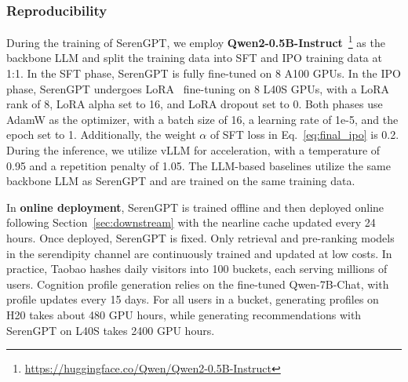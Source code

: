 \subsubsection{Reproducibility} During the training of SerenGPT, we employ \textbf{Qwen2-0.5B-Instruct}~\footnote{\url{https://huggingface.co/Qwen/Qwen2-0.5B-Instruct}} as the backbone LLM and split the training data into SFT and IPO training data at 1:1. In the SFT phase, SerenGPT is fully fine-tuned on 8 A100 GPUs. In the IPO phase, SerenGPT undergoes LoRA~\cite{hu2021lora} fine-tuning on 8 L40S GPUs, with a LoRA rank of 8, LoRA alpha set to 16, and LoRA dropout set to 0. Both phases use AdamW as the optimizer, with a batch size of 16, a learning rate of 1e-5, and the epoch set to 1. Additionally, the weight $\alpha$ of SFT loss in Eq.~\eqref{eq:final_ipo} is 0.2. During the inference, we utilize vLLM for acceleration, with a temperature of 0.95 and a repetition penalty of 1.05. The LLM-based baselines utilize the same backbone LLM as SerenGPT and are trained on the same training data.

In \textbf{online deployment}, SerenGPT is trained offline and then deployed online following Section~\ref{sec:downstream} with the nearline cache updated every 24 hours. Once deployed, SerenGPT is fixed. Only retrieval and pre-ranking models in the serendipity channel are continuously trained and updated at low costs. In practice, Taobao hashes daily visitors into 100 buckets, each serving millions of users. Cognition profile generation relies on the fine-tuned Qwen-7B-Chat, with profile updates every 15 days. For all users in a bucket, generating profiles on H20 takes about 480 GPU hours, while generating recommendations with SerenGPT on L40S takes 2400 GPU hours. 


